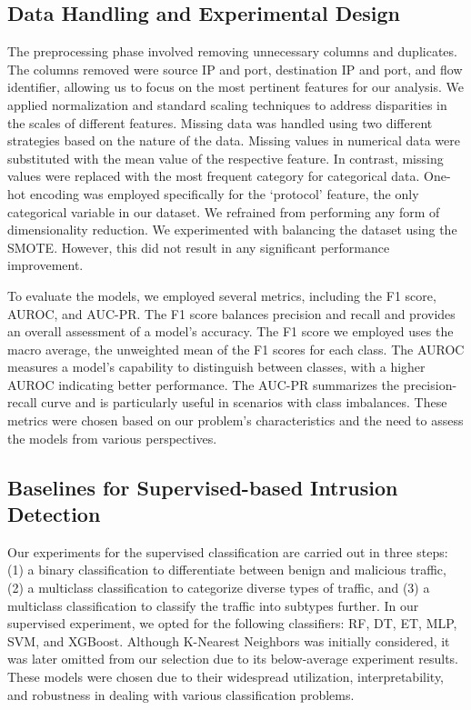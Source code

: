 \documentclass[lettersize,journal]{IEEEtran}
\begin{document}
\subsection{Data Handling and Experimental Design}\label{sec:setup}
The preprocessing phase involved removing unnecessary columns and duplicates. The columns removed were source IP and port, destination IP and port, and flow identifier, allowing us to focus on the most pertinent features for our analysis. We applied normalization and standard scaling techniques to address disparities in the scales of different features. Missing data was handled using two different strategies based on the nature of the data. Missing values in numerical data were substituted with the mean value of the respective feature.
In contrast, missing values were replaced with the most frequent category for categorical data. One-hot encoding was employed specifically for the `protocol' feature, the only categorical variable in our dataset. We refrained from performing any form of dimensionality reduction. We experimented with balancing the dataset using the \ac{SMOTE}. However, this did not result in any significant performance improvement.

To evaluate the models, we employed several metrics, including the F1 score, \ac{AUROC}, and \ac{AUC-PR}. The F1 score balances precision and recall and provides an overall assessment of a model's accuracy. The F1 score we employed uses the macro average, the unweighted mean of the F1 scores for each class. The \ac{AUROC} measures a model's capability to distinguish between classes, with a higher \ac{AUROC} indicating better performance. The \ac{AUC-PR} summarizes the precision-recall curve and is particularly useful in scenarios with class imbalances. These metrics were chosen based on our problem's characteristics and the need to assess the models from various perspectives.   

\subsection{Baselines for Supervised-based Intrusion Detection} \label{sec:supervised}
Our experiments for the supervised classification are carried out in three steps: (1) a binary classification to differentiate between benign and malicious traffic, (2) a multiclass classification to categorize diverse types of traffic, and (3) a multiclass classification to classify the traffic into subtypes further.
In our supervised experiment, we opted for the following classifiers: \ac{RF}, \ac{DT}, \ac{ET}, \ac{MLP}, \ac{SVM}, and \ac{XGBoost}. Although K-Nearest Neighbors was initially considered, it was later omitted from our selection due to its below-average experiment results. These models were chosen due to their widespread utilization, interpretability, and robustness in dealing with various classification problems.  
 
\end{document}

